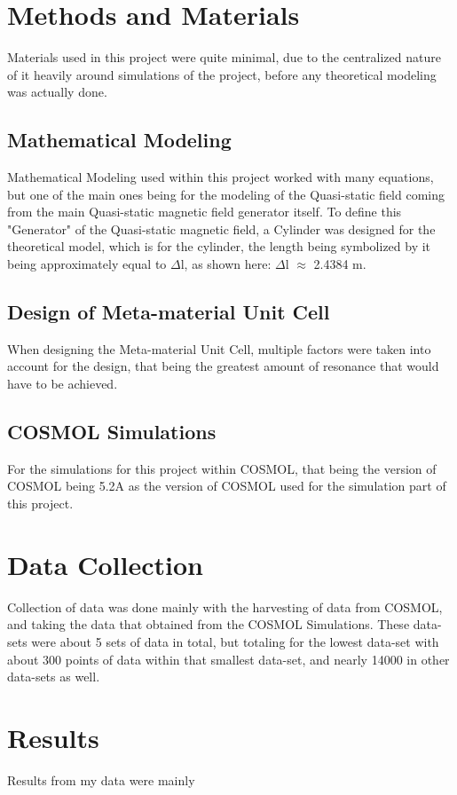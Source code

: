 \documentclass[]{article}
\begin{document}
\section{Methods and Materials} 
Materials used in this project were quite minimal, due to the centralized nature of it heavily around simulations of the project, before any theoretical modeling was actually done.
\subsection{Mathematical Modeling}
Mathematical Modeling used within this project worked with many equations, but one of the main ones being for the modeling of the Quasi-static field coming from the main Quasi-static magnetic field generator itself. To define this "Generator" of the Quasi-static magnetic field, a Cylinder was designed for the theoretical model, which is for the cylinder, the length being symbolized by it being approximately equal to $\Delta$l, as shown here: $\Delta$l $\approx$ 2.4384 m.
\subsection{Design of Meta-material Unit Cell}
When designing the Meta-material Unit Cell, multiple factors were taken into account for the design, that being the greatest amount of resonance that would have to be achieved. 
\subsection{COSMOL Simulations}
For the simulations for this project within COSMOL, that being the version of COSMOL being 5.2A as the version of COSMOL used for the simulation part of this project.

\section{Data Collection}
Collection of data was done mainly with the harvesting of data from COSMOL, and taking the data that obtained from the COSMOL Simulations. These data-sets were about 5 sets of data in total, but totaling for the lowest data-set with about 300 points of data within that smallest data-set, and nearly 14000 in other data-sets as well.

\section{Results}
Results from my data were mainly 
\end{document}
